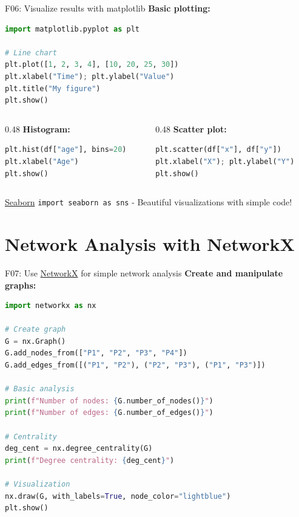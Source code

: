 \documentclass[aspectratio=169, 10pt]{beamer}
\begin{document}
\begin{frame}[fragile]{F06: Visualize results with matplotlib}
    \textbf{Basic plotting:}
    \begin{lstlisting}[language=Python]
import matplotlib.pyplot as plt

# Line chart
plt.plot([1, 2, 3, 4], [10, 20, 25, 30])
plt.xlabel("Time"); plt.ylabel("Value")
plt.title("My figure")
plt.show()
    \end{lstlisting}
    
    \begin{columns}[T]
        \begin{column}{0.48\textwidth}
            \textbf{Histogram:}
            \begin{lstlisting}[language=Python]
plt.hist(df["age"], bins=20)
plt.xlabel("Age")
plt.show()
            \end{lstlisting}
        \end{column}
        \begin{column}{0.48\textwidth}
            \textbf{Scatter plot:}
            \begin{lstlisting}[language=Python]
plt.scatter(df["x"], df["y"])
plt.xlabel("X"); plt.ylabel("Y")
plt.show()
            \end{lstlisting}
        \end{column}
    \end{columns}
    
    \vspace{0.2cm}
    \begin{block}{\footnotesize \href{https://seaborn.pydata.org/}{Seaborn}}
        \footnotesize \texttt{import seaborn as sns} - Beautiful visualizations with simple code!
    \end{block}
\end{frame}

\section{Network Analysis with NetworkX}

\begin{frame}[fragile]{F07: Use \href{https://networkx.org/}{NetworkX} for simple network analysis}
    \textbf{Create and manipulate graphs:}
    \begin{lstlisting}[language=Python]
import networkx as nx

# Create graph
G = nx.Graph()
G.add_nodes_from(["P1", "P2", "P3", "P4"])
G.add_edges_from([("P1", "P2"), ("P2", "P3"), ("P1", "P3")])

# Basic analysis
print(f"Number of nodes: {G.number_of_nodes()}")
print(f"Number of edges: {G.number_of_edges()}")

# Centrality
deg_cent = nx.degree_centrality(G)
print(f"Degree centrality: {deg_cent}")

# Visualization
nx.draw(G, with_labels=True, node_color="lightblue")
plt.show()
    \end{lstlisting}
\end{frame}
\end{document}
